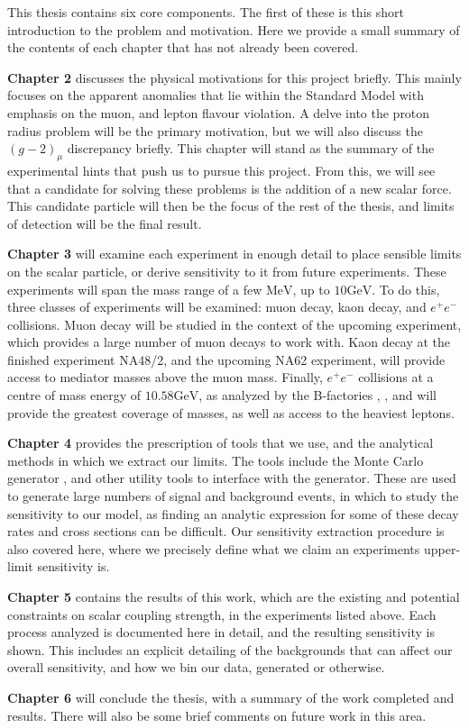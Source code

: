 This thesis contains six core components.
The first of these is this short introduction to the problem and motivation.
Here we provide a small summary of the contents of each chapter that has not already been covered.

\textbf{Chapter 2} discusses the physical motivations for this project briefly.
This mainly focuses on the apparent anomalies that lie within the Standard Model with emphasis on the muon, and lepton flavour violation.
A delve into the proton radius problem will be the primary motivation, but we will also discuss the $(g-2)_\mu$ discrepancy briefly.
This chapter will stand as the summary of the experimental hints that push us to pursue this project.
From this, we will see that a candidate for solving these problems is the addition of a new scalar force.
This candidate particle will then be the focus of the rest of the thesis, and limits of detection will be the final result.

\textbf{Chapter 3} will examine each experiment in enough detail to place sensible limits on the scalar particle, or derive sensitivity to it from future experiments.
These experiments will span the mass range of a few $\textrm{MeV}$, up to $10\textrm{GeV}$.
To do this, three classes of experiments will be examined: muon decay, kaon decay, and $e^+ e^-$ collisions.
Muon decay will be studied in the context of the upcoming \mueee experiment, which provides a large number of muon decays to work with.
Kaon decay at the finished experiment NA48/2, and the upcoming NA62 experiment, will provide access to mediator masses above the muon mass.
Finally, $e^+ e^-$ collisions at a centre of mass energy of $10.58\textrm{GeV}$, as analyzed by the B-factories \babar, \belle, and \belletwo will provide the greatest coverage of masses, as well as access to the heaviest leptons.

\textbf{Chapter 4} provides the prescription of tools that we use, and the analytical methods in which we extract our limits.
The tools include the Monte Carlo generator \madgraph, and other utility tools to interface with the generator.
These are used to generate large numbers of signal and background events, in which to study the sensitivity to our model, as finding an analytic expression for some of these decay rates and cross sections can be difficult.
Our sensitivity extraction procedure is also covered here, where we precisely define what we claim an experiments upper-limit sensitivity is.

\textbf{Chapter 5} contains the results of this work, which are the existing and potential constraints on scalar coupling strength, in the experiments listed above.
Each process analyzed is documented here in detail, and the resulting sensitivity is shown.
This includes an explicit detailing of the backgrounds that can affect our overall sensitivity, and how we bin our data, generated or otherwise.

\textbf{Chapter 6} will conclude the thesis, with a summary of the work completed and results.
There will also be some brief comments on future work in this area.
